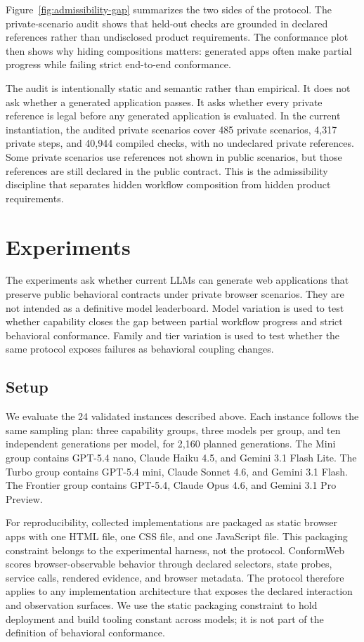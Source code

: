 Figure~\ref{fig:admissibility-gap} summarizes the two sides of the protocol.
The private-scenario audit shows that held-out checks are grounded in declared
references rather than undisclosed product requirements. The conformance plot
then shows why hiding compositions matters: generated apps often make partial
progress while failing strict end-to-end conformance.

The audit is intentionally static and semantic rather than empirical. It does
not ask whether a generated application passes. It asks whether every private
reference is legal before any generated application is evaluated. In the
current instantiation, the audited private scenarios cover 485 private
scenarios, 4,317 private steps, and 40,944 compiled checks, with no undeclared
private references. Some private scenarios use references not shown in public
scenarios, but those references are still declared in the public contract. This
is the admissibility discipline that separates hidden workflow composition
from hidden product requirements.

\section{Experiments}
\label{sec:experiments}

The experiments ask whether current LLMs can generate web applications that
preserve public behavioral contracts under private browser scenarios. They are
not intended as a definitive model leaderboard. Model variation is used to test
whether capability closes the gap between partial workflow progress and strict
behavioral conformance. Family and tier variation is used to test whether the
same protocol exposes failures as behavioral coupling changes.

\subsection{Setup}
\label{sec:setup}

We evaluate the 24 validated instances described above. Each instance follows
the same sampling plan: three capability groups, three models per group, and
ten independent generations per model, for 2,160 planned generations. The Mini
group contains GPT-5.4 nano, Claude Haiku 4.5, and Gemini 3.1 Flash Lite. The
Turbo group contains GPT-5.4 mini, Claude Sonnet 4.6, and Gemini 3.1 Flash.
The Frontier group contains GPT-5.4, Claude Opus 4.6, and Gemini 3.1 Pro
Preview.

For reproducibility, collected implementations are packaged as static browser
apps with one HTML file, one CSS file, and one JavaScript file. This packaging
constraint belongs to the experimental harness, not the protocol. ConformWeb
scores browser-observable behavior through declared selectors, state probes,
service calls, rendered evidence, and browser metadata. The protocol therefore
applies to any implementation architecture that exposes the declared
interaction and observation surfaces. We use the static packaging constraint to
hold deployment and build tooling constant across models; it is not part of the
definition of behavioral conformance.

